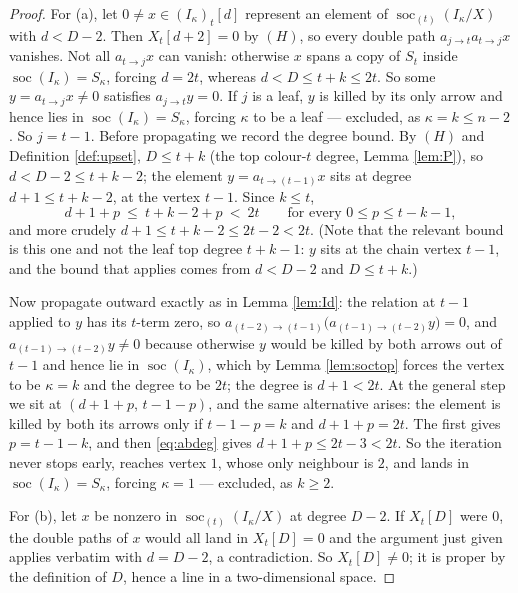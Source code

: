 \documentclass[reqno]{amsart}
\theoremstyle{plain}
\theoremstyle{definition}
\DeclareMathOperator{\soc}{soc}
\newcommand{\ka}{\kappa}
\begin{document}
\begin{proof}
For (a), let $0\ne x\in(I_\ka)_t[d]$ represent an element of
$\soc_{(t)}(I_\ka/X)$ with $d<D-2$.  Then $X_t[d+2]=0$ by $(H)$, so every
double path $a_{j\to t}a_{t\to j}x$ vanishes.  Not all $a_{t\to j}x$ can
vanish: otherwise $x$ spans a copy of $S_t$ inside $\soc(I_\ka)=S_\ka$, forcing
$d=2t$, whereas $d<D\le t+k\le 2t$.  So some $y=a_{t\to j}x\ne0$ satisfies
$a_{j\to t}y=0$.  If $j$ is a leaf, $y$ is killed by its only arrow and hence
lies in $\soc(I_\ka)=S_\ka$, forcing $\ka$ to be a leaf --- excluded, as
$\ka=k\le n-2$.  So $j=t-1$.  Before propagating we record the degree bound.  By $(H)$ and
Definition \ref{def:upset}, $D\le t+k$ (the top colour-$t$ degree, Lemma
\ref{lem:P}), so $d<D-2\le t+k-2$; the element $y=a_{t\to(t-1)}x$ sits at
degree $d+1\le t+k-2$, at the vertex $t-1$.  Since $k\le t$,
\begin{equation}\label{eq:abdeg}
   d+1+p\ \le\ t+k-2+p\ <\ 2t \qquad\text{for every } 0\le p\le t-k-1 ,
\end{equation}
and more crudely $d+1\le t+k-2\le 2t-2<2t$.  (Note that the relevant bound is
this one and not the leaf top degree $t+k-1$: $y$ sits at the chain vertex
$t-1$, and the bound that applies comes from $d<D-2$ and $D\le t+k$.)

Now propagate outward exactly as in Lemma \ref{lem:Id}: the relation at $t-1$
applied to $y$ has its $t$-term zero, so
$a_{(t-2)\to(t-1)}\bigl(a_{(t-1)\to(t-2)}y\bigr)=0$, and
$a_{(t-1)\to(t-2)}y\ne0$ because otherwise $y$ would be killed by both arrows
out of $t-1$ and hence lie in $\soc(I_\ka)$, which by Lemma \ref{lem:soctop}
forces the vertex to be $\ka=k$ and the degree to be $2t$; the degree is
$d+1<2t$.  At the general step we sit at $(d+1+p,\,t-1-p)$, and the same
alternative arises: the element is killed by both its arrows only if
$t-1-p=k$ and $d+1+p=2t$.  The first gives $p=t-1-k$, and then
\eqref{eq:abdeg} gives $d+1+p\le 2t-3<2t$.  So the iteration never stops
early, reaches vertex $1$, whose only neighbour is $2$, and lands in
$\soc(I_\ka)=S_\ka$, forcing $\ka=1$ --- excluded, as $k\ge2$.

For (b), let $x$ be nonzero in $\soc_{(t)}(I_\ka/X)$ at degree $D-2$.  If
$X_t[D]$ were $0$, the double paths of $x$ would all land in $X_t[D]=0$ and the
argument just given applies verbatim with $d=D-2$, a contradiction.  So
$X_t[D]\ne0$; it is proper by the definition of $D$, hence a line in a
two-dimensional space.
\end{proof}
\end{document}
